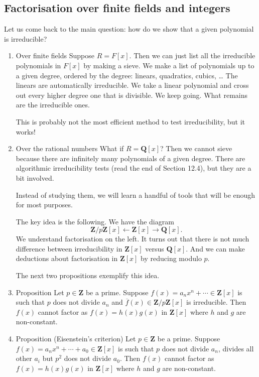 \documentclass[11pt]{article}
\begin{document}
\subsection{Factorisation over finite fields and integers}
\label{sec:org1c9488c}
Let us come back to the main question: how do we show that a given polynomial is irreducible?  
\begin{enumerate}
\item Over finite fields
\label{sec:orgf20db71}
Suppose \(R = F[x]\).
Then we can just list all the irreducible polynomials in \(F[x]\) by making a sieve.
We make a list of polynomials up to a given degree, ordered by the degree: linears, quadratics, cubics, \ldots{}
The linears are automatically irreducible.
We take a linear polynomial and cross out every higher degree one that is divisible.
We keep going.
What remains are the irreducible ones.

This is probably not the most efficient method to test irreducibility, but it works!
\item Over the rational numbers
\label{sec:orgcac25c8}
What if \(R = \mathbf{Q}[x]\)?
Then we cannot sieve because there are infinitely many polynomials of a given degree.
There are algorithmic irreducibility tests (read the end of Section 12.4), but they are a bit involved.

Instead of studying them, we will learn a handful of tools that will be enough for most purposes.

The key idea is the following.
We have the diagram
\[ \mathbf{Z}/p \mathbf{Z} [x] \leftarrow \mathbf{Z}[x] \rightarrow \mathbf{Q}[x].\]
We understand factorisation on the left.
It turns out that there is not much difference between irreducibility in \(\mathbf{Z}[x]\) versus \(\mathbf{Q}[x]\).
And we can make deductions about factorisation in \(\mathbf{Z}[x]\) by reducing modulo \(p\).

The next two propositions exemplify this idea.
\item Proposition
\label{sec:orgd4f0df9}
Let \(p \in \mathbf{Z}\) be a prime.
Suppose \(f(x) = a_{n} x^n + \cdots \in \mathbf{Z}[x]\) is such that \(p\) does not divide \(a_{n}\) and \(\overline f(x) \in \mathbf{Z}/p \mathbf{Z} [x]\) is irreducible.
Then \(f(x)\) cannot factor as \(f(x) = h(x) g(x)\) in \(\mathbf{Z}[x]\) where \(h\) and \(g\) are non-constant.
\item Proposition (Eisenstein's criterion)
\label{sec:org32fcc79}
Let \(p \in \mathbf{Z}\) be a prime.
Suppose \(f(x) = a_{n} x^n + \cdots + a_{0} \in \mathbf{Z}[x]\) is such that \(p\) does not divide \(a_{n}\), divides all other \(a_i\) but \(p^2\) does not divide \(a_{0}\).
Then \(f(x)\) cannot factor as \(f(x) = h(x) g(x)\) in \(\mathbf{Z}[x]\) where \(h\) and \(g\) are non-constant.
\end{enumerate}
\end{document}
